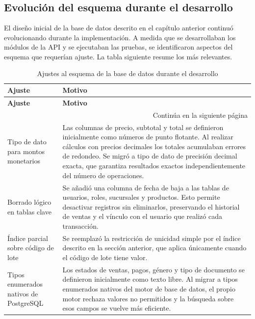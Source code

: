 \subsection{Evolución del esquema durante el desarrollo}

El diseño inicial de la base de datos descrito en el capítulo anterior continuó evolucionando durante la implementación. A medida que se desarrollaban los módulos de la API y se ejecutaban las pruebas, se identificaron aspectos del esquema que requerían ajuste. La tabla siguiente resume los más relevantes.

\begin{longtable}{|p{4.0cm}|p{10.5cm}|}

\caption{Ajustes al esquema de la base de datos durante el desarrollo} \label{tab:cap4-migraciones} \\

\hline
\rowcolor{gray!20}
\textbf{Ajuste} & \textbf{Motivo} \\
\hline
\endfirsthead

\hline
\rowcolor{gray!20}
\textbf{Ajuste} & \textbf{Motivo} \\
\hline
\endhead

\hline
\multicolumn{2}{|r|}{\small Continúa en la siguiente página} \\
\hline
\endfoot

\hline
\endlastfoot

Tipo de dato para montos monetarios &
Las columnas de precio, subtotal y total se definieron inicialmente como números de punto flotante. Al realizar cálculos con precios decimales los totales acumulaban errores de redondeo. Se migró a tipo de dato de precisión decimal exacta, que garantiza resultados exactos independientemente del número de operaciones. \\
\hline

Borrado lógico en tablas clave &
Se añadió una columna de fecha de baja a las tablas de usuarios, roles, sucursales y productos. Esto permite desactivar registros sin eliminarlos, preservando el historial de ventas y el vínculo con el usuario que realizó cada transacción. \\
\hline

Índice parcial sobre código de lote &
Se reemplazó la restricción de unicidad simple por el índice descrito en la sección anterior, que aplica únicamente cuando el código de lote tiene valor. \\
\hline

Tipos enumerados nativos de PostgreSQL &
Los estados de ventas, pagos, género y tipo de documento se definieron inicialmente como texto libre. Al migrar a tipos enumerados nativos del motor de base de datos, el propio motor rechaza valores no permitidos y la búsqueda sobre esos campos se vuelve más eficiente. \\
\hline


\end{longtable}
